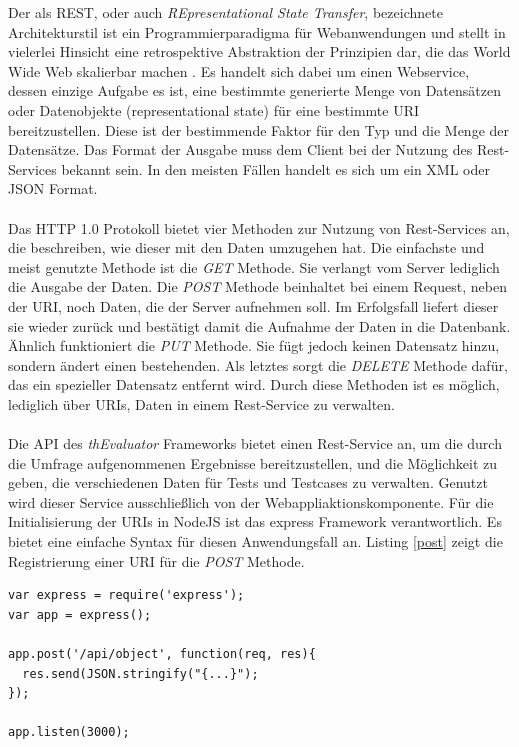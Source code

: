 Der als REST, oder auch \textit{\glqq REpresentational State Transfer\grqq{}}, bezeichnete Architekturstil ist ein Programmierparadigma für Webanwendungen und stellt in vielerlei Hinsicht eine retrospektive Abstraktion der Prinzipien dar, die das World Wide Web skalierbar machen \cite{rest}. Es handelt sich dabei um einen Webservice, dessen einzige Aufgabe es ist, eine bestimmte generierte Menge von Datensätzen oder Datenobjekte (representational state) für eine bestimmte \Gls{URI} bereitzustellen. Diese ist der bestimmende Faktor für den Typ und die Menge der Datensätze. Das Format der Ausgabe muss dem Client bei der Nutzung des Rest-Services bekannt sein. In den meisten Fällen handelt es sich um ein XML oder JSON Format.\\
\\
Das HTTP 1.0 Protokoll bietet vier Methoden zur Nutzung von Rest-Services an, die beschreiben, wie dieser mit den Daten umzugehen hat. Die einfachste und meist genutzte Methode ist die \textit{GET} Methode. Sie verlangt vom Server lediglich die Ausgabe der Daten. Die \textit{POST} Methode beinhaltet bei einem Request, neben der \Gls{URI}, noch Daten, die der Server aufnehmen soll. Im Erfolgsfall liefert dieser sie wieder zurück und bestätigt damit die Aufnahme der Daten in die Datenbank. Ähnlich funktioniert die \textit{PUT} Methode. Sie fügt jedoch keinen Datensatz hinzu, sondern ändert einen bestehenden. Als letztes sorgt die \textit{DELETE} Methode dafür, das ein spezieller Datensatz entfernt wird. Durch diese Methoden ist es möglich, lediglich über \Gls{URI}s, Daten in einem Rest-Service zu verwalten.\\
\\
Die API des \textit{thEvaluator} Frameworks bietet einen Rest-Service an, um die durch die Umfrage aufgenommenen Ergebnisse bereitzustellen, und die Möglichkeit zu geben, die verschiedenen Daten für Tests und Testcases zu verwalten. Genutzt wird dieser Service ausschließlich von der Webappliaktionskomponente. Für die Initialisierung der \Gls{URI}s in NodeJS ist das express Framework verantwortlich. Es bietet eine einfache Syntax für diesen Anwendungsfall an. Listing \ref{post} zeigt die Registrierung einer \Gls{URI} für die \textit{POST} Methode.

\vspace{1cm}
\begin{lstlisting}[caption=Registrierung einer URI für die \textit{POST} Methode,label=post]
var express = require('express');
var app = express();

app.post('/api/object', function(req, res){
  res.send(JSON.stringify("{...}");
});

app.listen(3000);
\end{lstlisting}
\vspace{0.6cm}

